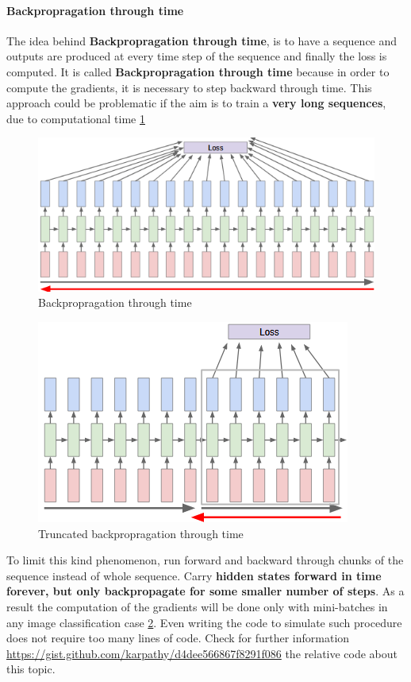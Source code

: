 \documentclass[11pt]{article}
\begin{document}
\paragraph{Backpropragation through time}
The idea behind \textbf{Backpropragation through time}, is to have a sequence and outputs are produced at every time step of the sequence and finally the loss is computed. It is called \textbf{Backpropragation through time} because in order to compute the gradients, it is necessary to step backward through time. This approach could be problematic if the aim is to train a \textbf{very long sequences}, due to computational time \ref{fig:L915}
\begin{figure}[h]
\centering
\captionsetup{justification=centering}
\includegraphics[width=0.8\linewidth]{L915.pdf}
\caption{ Backpropragation through time}
\label{fig:L915}
\end{figure}
\clearpage

\begin{figure}[h]
\centering
\captionsetup{justification=centering}
\includegraphics[width=0.8\linewidth]{L916.pdf}
\caption{ Truncated backpropragation through time}
\label{fig:L916}
\end{figure}
To limit this kind phenomenon, run forward and backward through chunks of the sequence instead of whole sequence.
Carry \textbf{hidden states forward in time forever, but only backpropagate for some smaller number of steps}. As a result the computation of the gradients will be done only with mini-batches in any image classification case \ref{fig:L916}.
Even writing the code to simulate such procedure does not require too many lines of code. Check for further information
\url{https://gist.github.com/karpathy/d4dee566867f8291f086} the relative code about this topic.
\end{document}
